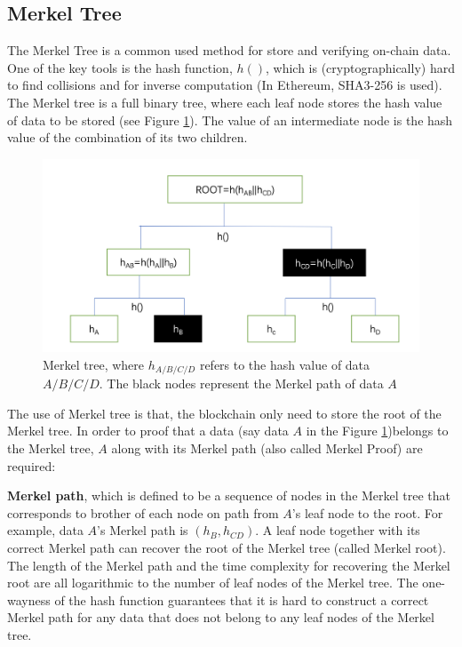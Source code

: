 \subsection{Merkel Tree}
The Merkel Tree is a common used method for store and verifying on-chain data. One of the key tools is the hash function, $h()$, which is (cryptographically) hard to find collisions and for inverse computation (In Ethereum, SHA3-256 is used). The Merkel tree is a full binary tree, where each leaf node stores the hash value of data to be stored (see Figure \ref{fig:merkel}). The value of an intermediate node is the hash value of the combination of its two children. 
\begin{figure}
	\centering
	\label{fig:merkel}
	\includegraphics[width=1.1\textwidth]{merkel.png}
	\caption{Merkel tree, where $h_{A/B/C/D}$ refers to the hash value of data $A/B/C/D$. The black nodes represent the Merkel path of data $A$}
\end{figure}

The use of Merkel tree is that, the blockchain only need to store the root of the Merkel tree. In order to proof that a data (say data $A$ in the Figure \ref{fig:merkel})belongs to the Merkel tree, $A$ along with its Merkel path (also called Merkel Proof) are required:

\textbf{Merkel path}, which is defined to be a sequence of nodes in the Merkel tree that corresponds to brother of each node on path from  $A$'s leaf node to the root. For example, data $A$'s Merkel path is $(h_B,h_{CD})$. A leaf node together with its correct Merkel path can recover the root of the Merkel tree (called Merkel root). The length of the Merkel path and the time complexity for recovering the Merkel root are all logarithmic to the number of leaf nodes of the Merkel tree. The one-wayness of the hash function guarantees that it is hard to construct a correct Merkel path for any data that does not belong to any leaf nodes of the Merkel tree.

